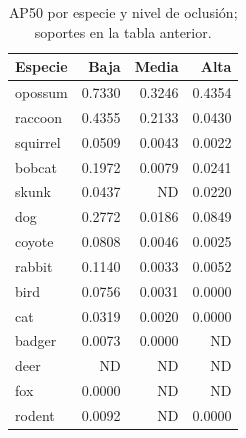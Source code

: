 \begin{table}[H]
\centering\small
\caption{AP50 por especie y nivel de oclusión; soportes en la tabla anterior.}
\begin{tabular}{lrrr}
\toprule
Especie & Baja & Media & Alta \\
\midrule
opossum & 0.7330 & 0.3246 & 0.4354 \\
raccoon & 0.4355 & 0.2133 & 0.0430 \\
squirrel & 0.0509 & 0.0043 & 0.0022 \\
bobcat & 0.1972 & 0.0079 & 0.0241 \\
skunk & 0.0437 & ND & 0.0220 \\
dog & 0.2772 & 0.0186 & 0.0849 \\
coyote & 0.0808 & 0.0046 & 0.0025 \\
rabbit & 0.1140 & 0.0033 & 0.0052 \\
bird & 0.0756 & 0.0031 & 0.0000 \\
cat & 0.0319 & 0.0020 & 0.0000 \\
badger & 0.0073 & 0.0000 & ND \\
deer & ND & ND & ND \\
fox & 0.0000 & ND & ND \\
rodent & 0.0092 & ND & 0.0000 \\
\bottomrule
\end{tabular}
\end{table}

